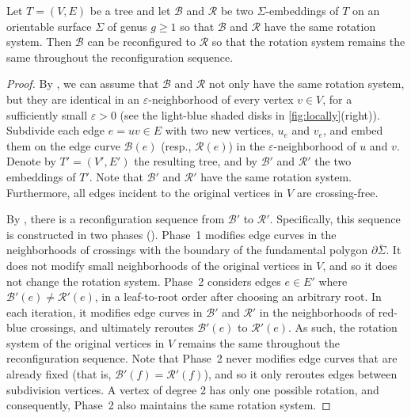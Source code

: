 \documentclass[a4paper,USenglish,cleveref,colorlinks=true,urlcolor=black,linkcolor=black,citecolor=black,thm-restate,authorcolumns]{lipics-v2021}
\theoremstyle{claimstyle}
\begin{document}
\begin{lemma}\label{lem:reduction-to-tree}
    Let $T = (V,E)$ be a tree and let $\mathcal{B}$ and $\mathcal{R}$ be two
    $\Sigma$-embeddings of $T$ on an orientable surface $\Sigma$ of genus $g\geq 1$
    so that $\mathcal{B}$ and $\mathcal{R}$ have the same rotation system.
    Then $\mathcal{B}$ can be reconfigured to $\mathcal{R}$ so that the rotation system remains the same throughout the reconfiguration sequence.
\end{lemma}
\begin{proof}
    By , we can assume that $\mathcal{B}$ and $\mathcal{R}$ not only have the same rotation system, but they are identical in an $\varepsilon$-neighborhood of every vertex $v\in V$, for a sufficiently small $\varepsilon>0$ (see the light-blue shaded disks in \cref{fig:locally}(right)).
    Subdivide each edge $e=uv\in E$ with two new vertices, $u_e$ and $v_e$, and embed them on the edge curve $\mathcal{B}(e)$ (resp., $\mathcal{R}(e)$) in the $\varepsilon$-neighborhood of $u$ and $v$.
    Denote by $T'=(V',E')$ the resulting tree, and by $\mathcal{B}'$ and $\mathcal{R}'$ the two embeddings of $T'$.
    Note that $\mathcal{B}'$ and $\mathcal{R}'$ have the same rotation system.
    Furthermore, all edges incident to the original vertices in $V$ are crossing-free.

    By , there is a reconfiguration sequence from $\mathcal{B'}$ to $\mathcal{R}'$.
    Specifically, this sequence is constructed in two phases (). Phase~1 modifies edge curves in the neighborhoods of crossings with the boundary of the fundamental polygon $\partial \bar{\Sigma}$.
    It does not modify small neighborhoods of the original vertices in $V$, and so it does not change the rotation system.
    Phase~2 considers  edges $e\in E'$ where $\mathcal{B}'(e)\neq \mathcal{R}'(e)$, in a leaf-to-root order after choosing an arbitrary root.
    In each iteration, it modifies edge curves in $\mathcal{B}'$ and $\mathcal{R}'$ in the neighborhoods of red-blue crossings, and ultimately reroutes $\mathcal{B}'(e)$ to $\mathcal{R}'(e)$.
    As such, the rotation system of the original vertices in $V$ remains the same throughout the reconfiguration sequence.
    Note that Phase~2 never modifies edge curves that are already fixed (that is, $\mathcal{B}'(f)=\mathcal{R}'(f)$), and so it only reroutes edges between subdivision vertices.
    A vertex of degree 2 has only one possible rotation, and consequently, Phase~2 also maintains the same rotation system.
\end{proof}
\end{document}
